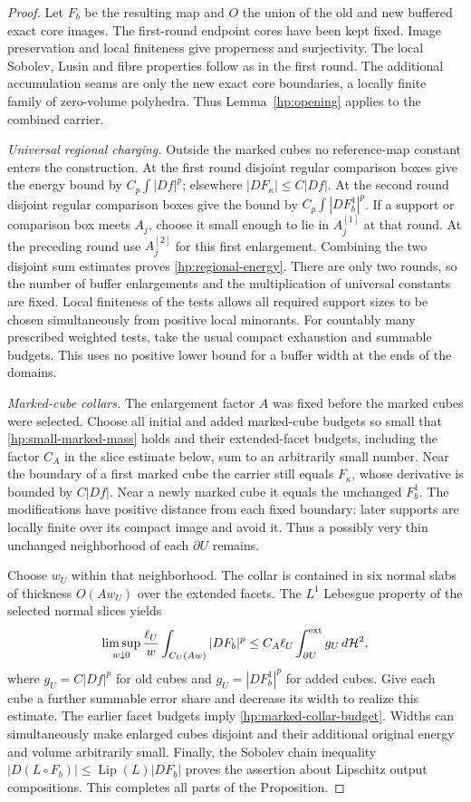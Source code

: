 \documentclass[11pt]{article}
\numberwithin{equation}{section}
\theoremstyle{definition}
\theoremstyle{remark}
\newcommand{\cH}{\mathcal H}
\DeclareMathOperator{\Lip}{Lip}
\begin{document}
\begin{proof}
Let $F_b$ be the resulting map and $O$ the union of the old and new
buffered exact core images.  The first-round endpoint cores have
been kept fixed.  Image preservation and local finiteness give
properness and surjectivity.  The local Sobolev, Lusin and fibre
properties follow as in the first round.  The additional
accumulation seams are only the new exact core boundaries, a locally
finite family of zero-volume polyhedra.  Thus
Lemma~\ref{hp:opening} applies to the combined carrier.

\emph{Universal regional charging.}
Outside the marked cubes no reference-map constant enters the
construction.  At the first round disjoint regular comparison boxes
give the energy bound by $C_p\int|Df|^p$; elsewhere
$|DF_\kappa|\leq C|Df|$.  At the second round disjoint regular
comparison boxes give the bound by $C_p\int|DF_b^1|^p$.
If a support or comparison box meets $A_j$, choose it small enough
to lie in $A_j^{[1]}$ at that round.  At the preceding round use
$A_j^{[2]}$ for this first enlargement.  Combining the two disjoint
sum estimates proves \eqref{hp:regional-energy}.  There are only two
rounds, so the number of buffer enlargements and the multiplication
of universal constants are fixed.  Local finiteness of the tests
allows all required support sizes to be chosen simultaneously from
positive local minorants.  For countably many prescribed weighted
tests, take the usual compact exhaustion and summable budgets.
This uses no positive lower bound for a buffer width at the ends
of the domains.

\emph{Marked-cube collars.}
The enlargement factor $A$ was fixed before the marked cubes were
selected.  Choose all initial and added marked-cube budgets so small
that \eqref{hp:small-marked-mass} holds and their extended-facet budgets,
including the factor $C_A$ in the slice estimate below, sum to an
arbitrarily small number.  Near the boundary of a first
marked cube the carrier still equals $F_\kappa$, whose derivative
is bounded by $C|Df|$.  Near a newly marked cube it equals the
unchanged $F_b^1$.  The modifications have positive distance from
each fixed boundary: later supports are locally finite over its
compact image and avoid it.  Thus a possibly very thin unchanged
neighborhood of each $\partial U$ remains.

Choose $w_U$ within that neighborhood.  The collar is contained in
six normal slabs of thickness $O(Aw_U)$ over the extended facets.
The $L^1$ Lebesgue property of the selected normal slices yields
\[
 \limsup_{w\downarrow0}\frac{\ell_U}{w}
       \int_{C_U(Aw)}|DF_b|^p
 \leq C_A\ell_U\int_{\partial U}^{\rm ext}g_U\,d\cH^2,
\]
where $g_U=C|Df|^p$ for old cubes and
$g_U=|DF_b^1|^p$ for added cubes.  Give each cube a further summable
error share and decrease its width to realize this estimate.  The
earlier facet budgets imply \eqref{hp:marked-collar-budget}.
Widths can simultaneously make enlarged cubes disjoint and their
additional original energy and volume arbitrarily small.  Finally,
the Sobolev chain inequality
$|D(L\circ F_b)|\leq\Lip(L)|DF_b|$ proves the assertion about
Lipschitz output compositions.  This completes all parts of the
Proposition.
\end{proof}
\end{document}
